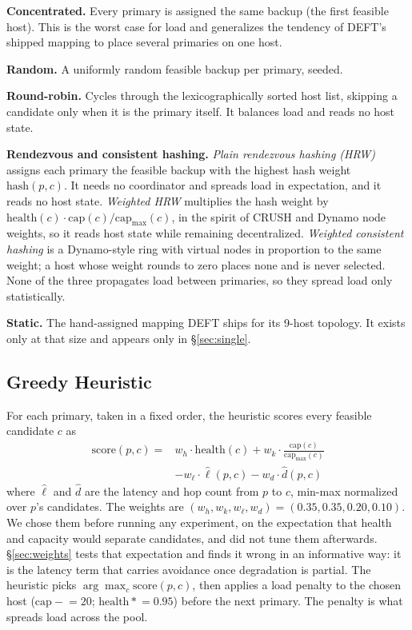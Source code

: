 \documentclass[journal]{IEEEtran}
\begin{document}
\textbf{Concentrated.} Every primary is assigned the same backup (the first
feasible host). This is the worst case for load and generalizes the tendency of
DEFT's shipped mapping to place several primaries on one host.

\textbf{Random.} A uniformly random feasible backup per primary, seeded.

\textbf{Round-robin.} Cycles through the lexicographically sorted host list,
skipping a candidate only when it is the primary itself. It balances load and
reads no host state.

\textbf{Rendezvous and consistent hashing.} \emph{Plain rendezvous hashing
(HRW)} assigns each primary the feasible backup with the highest hash weight
$\mathrm{hash}(p,c)$. It needs no coordinator and spreads load in expectation,
and it reads no host state. \emph{Weighted HRW} multiplies the hash weight by
$\mathrm{health}(c)\cdot\mathrm{cap}(c)/\mathrm{cap}_{\max}(c)$, in the spirit
of CRUSH and Dynamo node weights, so it reads host state while remaining
decentralized. \emph{Weighted consistent hashing} is a Dynamo-style ring with
virtual nodes in proportion to the same weight; a host whose weight rounds to
zero places none and is never selected. None of the three propagates load
between primaries, so they spread load only statistically.

\textbf{Static.} The hand-assigned mapping DEFT ships for its 9-host topology.
It exists only at that size and appears only in \S\ref{sec:single}.

\subsection{Greedy Heuristic}
\label{sec:heuristic}

For each primary, taken in a fixed order, the heuristic scores every feasible
candidate $c$ as
\begin{equation}
\label{eq:score}
\begin{split}
\mathrm{score}(p, c) ={}& w_h \cdot \mathrm{health}(c) + w_k \cdot \frac{\mathrm{cap}(c)}{\mathrm{cap}_{\max}(c)} \\
&- w_\ell \cdot \hat\ell(p,c) - w_d \cdot \hat{d}(p,c)
\end{split}
\end{equation}
where $\hat\ell$ and $\hat{d}$ are the latency and hop count from $p$ to $c$,
min-max normalized over $p$'s candidates. The weights are
$(w_h, w_k, w_\ell, w_d) = (0.35, 0.35, 0.20, 0.10)$. We chose them before
running any experiment, on the expectation that health and capacity would
separate candidates, and did not tune them afterwards. \S\ref{sec:weights} tests
that expectation and finds it wrong in an informative way: it is the latency
term that carries avoidance once degradation is partial. The heuristic picks
$\arg\max_c \mathrm{score}(p,c)$, then applies a load penalty to the chosen host
($\mathrm{cap} \mathrel{-}= 20$; $\mathrm{health} \mathrel{*}= 0.95$) before the
next primary. The penalty is what spreads load across the pool.
\end{document}
